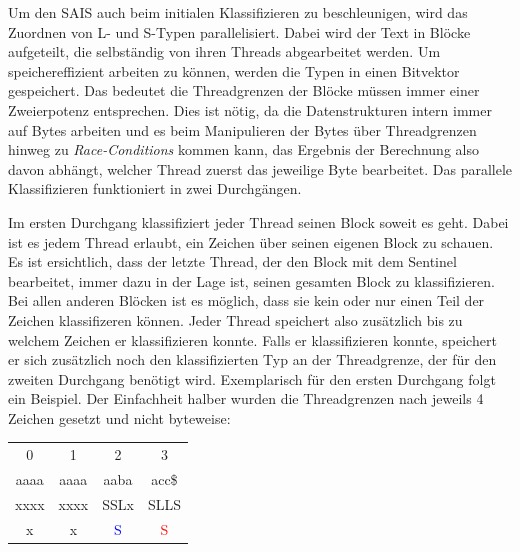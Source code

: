 Um den SAIS auch beim initialen Klassifizieren zu beschleunigen, wird das Zuordnen von L- und S-Typen parallelisiert. Dabei wird der Text in Blöcke aufgeteilt, die selbständig von ihren Threads abgearbeitet werden. Um speichereffizient arbeiten zu können, werden die Typen in einen Bitvektor gespeichert. Das bedeutet die Threadgrenzen der Blöcke müssen immer einer Zweierpotenz entsprechen. Dies ist nötig, da die Datenstrukturen intern immer auf Bytes arbeiten und es beim Manipulieren der Bytes über Threadgrenzen hinweg zu \textit{Race-Conditions} kommen kann, das Ergebnis der Berechnung also davon abhängt, welcher Thread zuerst das jeweilige Byte bearbeitet.
Das parallele Klassifizieren funktioniert in zwei Durchgängen. 

Im ersten Durchgang klassifiziert jeder Thread seinen Block soweit es geht. Dabei ist es jedem Thread erlaubt, ein Zeichen über seinen eigenen Block zu schauen. Es ist ersichtlich, dass der letzte Thread, der den Block mit dem Sentinel bearbeitet, immer dazu in der Lage ist, seinen gesamten Block zu klassifizieren. Bei allen anderen Blöcken ist es möglich, dass sie kein oder nur einen Teil der Zeichen klassifizeren können. Jeder Thread speichert also zusätzlich bis zu welchem Zeichen er klassifizieren konnte. Falls er klassifizieren konnte, speichert er sich zusätzlich noch den klassifizierten Typ an der Threadgrenze, der für den zweiten Durchgang benötigt wird.
Exemplarisch für den ersten Durchgang folgt ein Beispiel. Der Einfachheit halber wurden die Threadgrenzen nach jeweils 4 Zeichen gesetzt und nicht byteweise:

\begin{center}
	\begin{tabular}{c|c|c|c}     
	           0     &             1         &           2          			&             3    \\   
          	aaaa     &          aaaa         &        aaba           			&          acc\$    \\            
         	xxxx     &          xxxx         &        SSLx           			&          SLLS     \\     
         	  x      &            x          &   \textcolor{blue}{S}            &          \textcolor{red}{S}      \\            	       
	\end{tabular}
\end{center}

